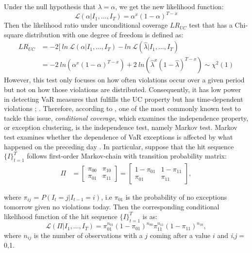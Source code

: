 \documentclass[12pt,a4paper]{article}
\begin{document}
Under the null hypothesis that $\lambda = \alpha$, we get the new likelihood function:
\begin{equation}
	\mathcal{L} (\alpha \vert I_1, \ldots, I_T) = \alpha^x (1-\alpha)^{T-x}
\end{equation}
Then the likelihood ratio under unconditional coverage $LR_{UC}$ test that has a Chi-square distribution with one degree of freedom is defined as:
\begin{align}
	LR_{UC} &= -2[\:ln\: \mathcal{L}(\alpha\vert I_1, \ldots, I_T) - ln\: \mathcal{L} (\hat{\lambda} \vert I_1, \ldots, I_T) \nonumber \\
	&= -2\:ln (\alpha^x (1-\alpha)^{T-x}) + 2\:ln (\hat{\lambda}^x (1-\hat{\lambda})^{T-x}) \sim \chi^2(1)
\end{align}
However, this test only focuses on how often violations occur over a given period but not on how those violations are distributed. Consequently, it has low power in detecting VaR measures that fulfills the UC property but has time-dependent violations \cite{campbell2005review}; \cite{christoffersen1998evaluating}. Therefore, according to \cite{christoffersen1998evaluating}, one of the most commonly known test to tackle this issue, \textit{conditional coverage}, which examines the independence property, or exception clustering, is the independence test, namely Markov test. Markov test examines whether the dependence of VaR exceptions is affected by what happened on the preceding day \citep{campbell2005review}. In particular, suppose that the hit sequence $\{I\}^T_{t=1}$ follows first-order Markov-chain with transition probability matrix:
\begin{align}
	\Pi &= \begin{bmatrix} \pi_{00} & \pi_{10} \\ \pi_{01} & \pi_{11} \end{bmatrix} = \begin{bmatrix} 1- \pi_{01} & 1- \pi_{11} \\ \pi_{01} & \pi_{11} \end{bmatrix},
\end{align}

where $\pi_{ij}$ = $P(I_t = j \vert I_{t-1} = i)$, i.e $\pi_{01}$ is the probability  of no exceptions tomorrow given no violations today. Then the corresponding conditional likelihood function of the hit sequence $\{I\}^T_{t=1}$ is as:
\begin{equation}
	\mathcal{L}(\Pi\vert I_1, \ldots,I_T) = \pi^{n_{01}}_{01} (1-\pi_{01})^{n_{00}} \pi^{n_{11}}_{11} (1-\pi_{11})^{n_{10}},
\end{equation}
where $n_{ij}$ is the number of observations with a $j$ coming after a value $i$ and \textit{i,j} = 0,1.\par 
\end{document}
